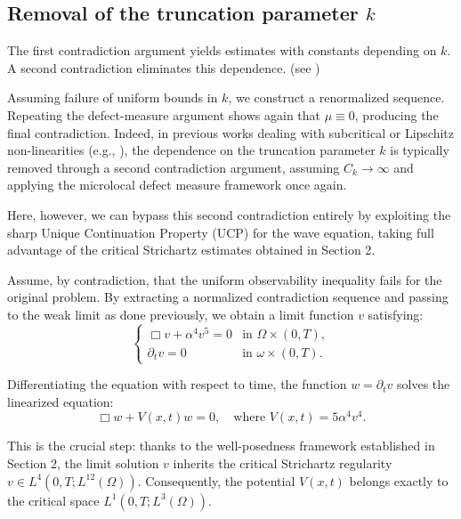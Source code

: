 \documentclass[11pt,letterpaper]{amsart}
\begin{document}
\subsection{Removal of the truncation parameter $k$}

The first contradiction argument yields estimates with constants
depending on $k$. A second contradiction eliminates this dependence. (see \cite{Cavalcanti2024})

Assuming failure of uniform bounds in $k$, we construct a renormalized
sequence. Repeating the defect-measure argument shows again that
$\mu \equiv 0$, producing the final contradiction. Indeed,
in previous works dealing with subcritical or Lipschitz non-linearities (e.g., \cite{Cavalcanti2024}), the dependence on the truncation parameter $k$ is typically removed through a second contradiction argument, assuming $C_k \to \infty$ and applying the microlocal defect measure framework once again.

Here, however, we can bypass this second contradiction entirely by exploiting the sharp Unique Continuation Property (UCP) for the wave equation, taking full advantage of the critical Strichartz estimates obtained in Section 2.

Assume, by contradiction, that the uniform observability inequality fails for the original problem. By extracting a normalized contradiction sequence and passing to the weak limit as done previously, we obtain a limit function $v$ satisfying:
\begin{equation}
\begin{cases}
\Box v + \alpha^4 v^5 = 0 & \text{in } \Omega \times (0,T), \\
\partial_t v = 0 & \text{in } \omega \times (0,T).
\end{cases}
\end{equation}

Differentiating the equation with respect to time, the function $w = \partial_t v$ solves the linearized equation:
\begin{equation}
\Box w + V(x,t)w = 0, \quad \text{where } V(x,t) = 5\alpha^4 v^4.
\end{equation}

This is the crucial step: thanks to the well-posedness framework established in Section 2, the limit solution $v$ inherits the critical Strichartz regularity $v \in L^4(0,T; L^{12}(\Omega))$. Consequently, the potential $V(x,t)$ belongs exactly to the critical space $L^1(0,T; L^3(\Omega))$.
\end{document}

